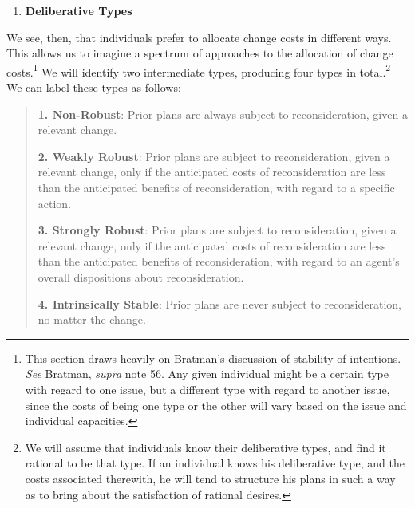 \begin{enumerate}
\def\labelenumi{\arabic{enumi}.}
\item
  \textbf{Deliberative Types}
\end{enumerate}

We see, then, that individuals prefer to allocate change costs in
different ways. This allows us to imagine a spectrum of approaches to
the allocation of change costs.\footnote{This section draws heavily on
  Bratman's discussion of stability of intentions. \emph{See} Bratman,
  \emph{supra} note 56. Any given individual might be a certain type
  with regard to one issue, but a different type with regard to another
  issue, since the costs of being one type or the other will vary based
  on the issue and individual capacities.} We will identify two
intermediate types, producing four types in total.\footnote{We will
  assume that individuals know their deliberative types, and find it
  rational to be that type. If an individual knows his deliberative
  type, and the costs associated therewith, he will tend to structure
  his plans in such a way as to bring about the satisfaction of rational
  desires.} We can label these types as follows:

\begin{quote}
\textbf{1. Non-Robust}: Prior plans are always subject to
reconsideration, given a relevant change.

\textbf{2. Weakly Robust}: Prior plans are subject to reconsideration,
given a relevant change, only if the anticipated costs of
reconsideration are less than the anticipated benefits of
reconsideration, with regard to a specific action.

\textbf{3. Strongly Robust}: Prior plans are subject to reconsideration,
given a relevant change, only if the anticipated costs of
reconsideration are less than the anticipated benefits of
reconsideration, with regard to an agent's overall dispositions about
reconsideration.

\textbf{4. Intrinsically Stable}: Prior plans are never subject to
reconsideration, no matter the change.
\end{quote}

